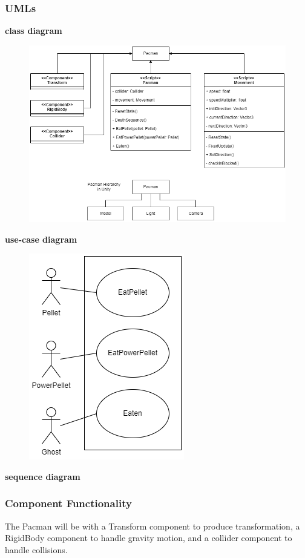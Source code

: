 \documentclass[11pt]{article}
\begin{document}
\subsubsection{UMLs}
\textbf{class diagram}\\
\begin{figure}[H]
    \centering
    \includegraphics*[scale=0.4]{Pacman_Class.png}
\end{figure}
\textbf{use-case diagram}\\
\begin{figure}[H]
    \centering
    \includegraphics*[scale=0.4]{Pacman_use-case.png}
\end{figure}
\textbf{sequence diagram}\\
\subsubsection{Component Functionality}
The Pacman will be with a Transform component to produce transformation, a RigidBody component to handle gravity motion, and a collider component to handle collisions.
\end{document}
